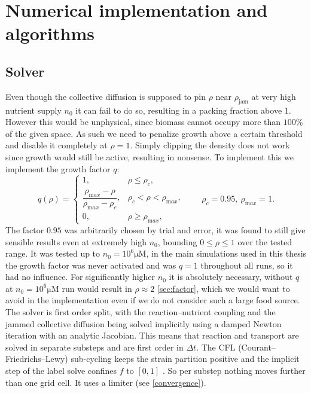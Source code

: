 \documentclass[11pt,a4paper]{report}
\begin{document}
	\section{Numerical implementation and algorithms}
	\subsection{Solver}
	Even though the collective diffusion is supposed to pin $\rho$ near $\rho_{\mathrm{jam}}$ at very high nutrient supply $n_0$ it can fail to do so, resulting in a packing fraction above 1. However this would be unphysical, since biomass cannot occupy more than $100\%$ of the given space. As such we need to penalize growth above a certain threshold and disable it completely at $\rho=1$. Simply clipping the density does not work since growth would still be active, resulting in nonsense. To implement this we implement the growth factor $q$:
	\begin{equation}
		q(\rho)=\begin{cases}
			1, & \rho\le\rho_c,\\[2pt]
			\dfrac{\rho_{\mathrm max}-\rho}{\rho_{\mathrm max}-\rho_c}, & \rho_c<\rho<\rho_{\mathrm max},\\[6pt]
			0,&\rho\ge\rho_{\mathrm max},
		\end{cases}
		\qquad \rho_c=0.95,\ \rho_{\mathrm max}=1 .
		\label{eq:q}
	\end{equation}
	The factor $0.95$ was arbitrarily chosen by trial and error, it was found to still give sensible results even at extremely high $n_0$, bounding $0\le \rho \le 1$ over the tested range. It was tested up to $n_0=10^6 \mathrm{\mu M}$, in the main simulations used in this thesis the growth factor was never activated and was $q=1$ throughout all runs, so it had no influence. For significantly higher $n_0$ it is absolutely necessary, without $q$ at $n_0=10^6 \mathrm{\mu M}$ run would result in $\rho \approx 2$ \ref{sec:factor}, which we would want to avoid in the implementation even if we do not consider such a large food source. The solver is first order split, with the reaction–nutrient coupling and
	the jammed collective diffusion being solved implicitly using a damped Newton iteration with an analytic Jacobian. This means that reaction and transport are solved in separate substeps and are first order in $\Delta t$. The CFL (Courant–Friedrichs–Lewy) sub-cycling keeps the strain partition positive and  the implicit step of the label solve confines $f$ to $[0,1]$ \cite{Leveque}. So per substep nothing moves further than one grid cell. It uses a limiter (see \cref{convergence}).
\end{document}
